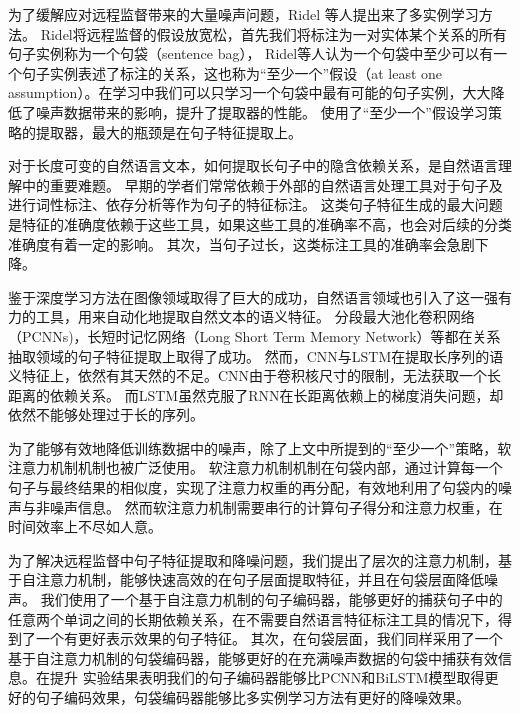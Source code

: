\documentclass[UTF8]{csoarticle}
\begin{document}
为了缓解应对远程监督带来的大量噪声问题，Ridel \cite{bib1} 等人提出来了多实例学习方法。
Ridel将远程监督的假设放宽松，首先我们将标注为一对实体某个关系的所有句子实例称为一个句袋（sentence bag），
Ridel等人认为一个句袋中至少可以有一个句子实例表述了标注的关系，这也称为“至少一个”假设（at least one assumption）。在学习中我们可以只学习一个句袋中最有可能的句子实例，大大降低了噪声数据带来的影响，提升了提取器的性能。
使用了“至少一个”假设学习策略的提取器，最大的瓶颈是在句子特征提取上。

对于长度可变的自然语言文本，如何提取长句子中的隐含依赖关系，是自然语言理解中的重要难题。
早期的学者们常常依赖于外部的自然语言处理工具对于句子及进行词性标注、依存分析等作为句子的特征标注。
这类句子特征生成的最大问题是特征的准确度依赖于这些工具，如果这些工具的准确率不高，也会对后续的分类准确度有着一定的影响。
其次，当句子过长，这类标注工具的准确率会急剧下降。

鉴于深度学习方法在图像领域取得了巨大的成功，自然语言领域也引入了这一强有力的工具，用来自动化地提取自然文本的语义特征。
分段最大池化卷积网络（PCNNs)\cite{bib3}，长短时记忆网络（Long Short Term Memory Network）等都在关系抽取领域的句子特征提取上取得了成功。
然而，CNN与LSTM在提取长序列的语义特征上，依然有其天然的不足。CNN由于卷积核尺寸的限制，无法获取一个长距离的依赖关系。
而LSTM虽然克服了RNN在长距离依赖上的梯度消失问题，却依然不能够处理过于长的序列。

为了能够有效地降低训练数据中的噪声，除了上文中所提到的“至少一个”策略，软注意力机制机制也被广泛使用。
软注意力机制机制在句袋内部，通过计算每一个句子与最终结果的相似度，实现了注意力权重的再分配，有效地利用了句袋内的噪声与非噪声信息。
然而软注意力机制需要串行的计算句子得分和注意力权重，在时间效率上不尽如人意。

为了解决远程监督中句子特征提取和降噪问题，我们提出了层次的注意力机制，基于自注意力机制，能够快速高效的在句子层面提取特征，并且在句袋层面降低噪声。
我们使用了一个基于自注意力机制的句子编码器，能够更好的捕获句子中的任意两个单词之间的长期依赖关系，在不需要自然语言特征标注工具的情况下，得到了一个有更好表示效果的句子特征。
其次，在句袋层面，我们同样采用了一个基于自注意力机制的句袋编码器，能够更好的在充满噪声数据的句袋中捕获有效信息。在提升
实验结果表明我们的句子编码器能够比PCNN和BiLSTM模型取得更好的句子编码效果，句袋编码器能够比多实例学习方法有更好的降噪效果。
\end{document}
